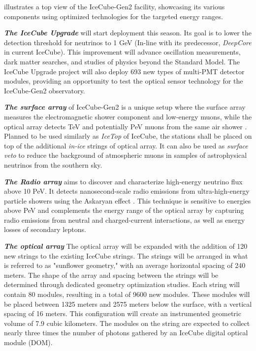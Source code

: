  illustrates a top view of the IceCube-Gen2 facility, showcasing its various components using optimized technologies for the targeted energy ranges. 

\begin{description}
    \item \textbf{\emph{The IceCube Upgrade}} will start deployment this season. Its goal is to lower the detection threshold for neutrinos to 1 GeV (In-line with its predecessor, \emph{DeepCore} in current IceCube). This improvement will advance oscillation measurements, dark matter searches, and studies of physics beyond the Standard Model. The IceCube Upgrade project will also deploy 693 new types of multi-PMT detector modules, providing an opportunity to test the optical sensor technology for the IceCube-Gen2 observatory.

    \item \textbf{\emph{The surface array}} of IceCube-Gen2 is a unique setup where the surface array measures the electromagnetic shower component and low-energy muons, while the optical array detects TeV and potentially PeV muons from the same air shower . Planned to be used similarly as \emph{IceTop} of IceCube, the stations shall be placed on top of the additional \emph{in-ice} strings of optical array. It can also be used as \emph{surface veto} to reduce the background of atmospheric muons in samples of astrophysical neutrinos from the southern sky.

    \item \textbf{\emph{The Radio array}} aims to discover and characterize high-energy neutrino flux above 10 PeV. It detects nanosecond-scale radio emissions from ultra-high-energy particle showers using the Askaryan effect . This technique is sensitive to energies above PeV and complements the energy range of the optical array by capturing radio emissions from neutral and charged-current interactions, as well as energy losses of secondary leptons. 

    \item \textbf{\emph{The optical array}} The optical array will be expanded with the addition of 120 new strings to the existing IceCube strings. The strings will be arranged in what is referred to as "sunflower geometry," with an average horizontal spacing of 240 meters. The shape of the array and spacing between the strings will be determined through dedicated geometry optimization studies. Each string will contain 80 modules, resulting in a total of 9600 new modules. These modules will be placed between 1325 meters and 2575 meters below the surface, with a vertical spacing of 16 meters. This configuration will create an instrumented geometric volume of 7.9 cubic kilometers. The modules on the string are expected to collect nearly three times the number of photons gathered by an IceCube digital optical module (DOM).
\end{description}

